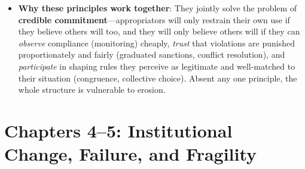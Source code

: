 \documentclass[12pt]{article}
\begin{document}
\begin{itemize}[leftmargin=*, itemsep=4pt]
\begin{enumerate}
        \item \textbf{Minimal recognition of rights to organize}: The rights of appropriators to devise their own institutions are not challenged by external governmental authorities---external authorities (the state) tolerate or explicitly recognize local self-governance rather than overriding it.
        \item \textbf{Nested enterprises} (for CPRs that are part of larger systems): Appropriation, provision, monitoring, enforcement, conflict resolution, and governance activities are organized in multiple layers of nested enterprises, with local institutions embedded within (and coordinated with) larger-scale institutions---an application of the polycentricity concept to CPR governance at scale.
    \end{enumerate}
    \item \textbf{Why these principles work together}: They jointly solve the problem of \textbf{credible commitment}---appropriators will only restrain their own use if they believe others will too, and they will only believe others will if they can \emph{observe} compliance (monitoring) cheaply, \emph{trust} that violations are punished proportionately and fairly (graduated sanctions, conflict resolution), and \emph{participate} in shaping rules they perceive as legitimate and well-matched to their situation (congruence, collective choice). Absent any one principle, the whole structure is vulnerable to erosion.
\end{itemize}

\section{Chapters 4--5: Institutional Change, Failure, and Fragility}
\end{document}
